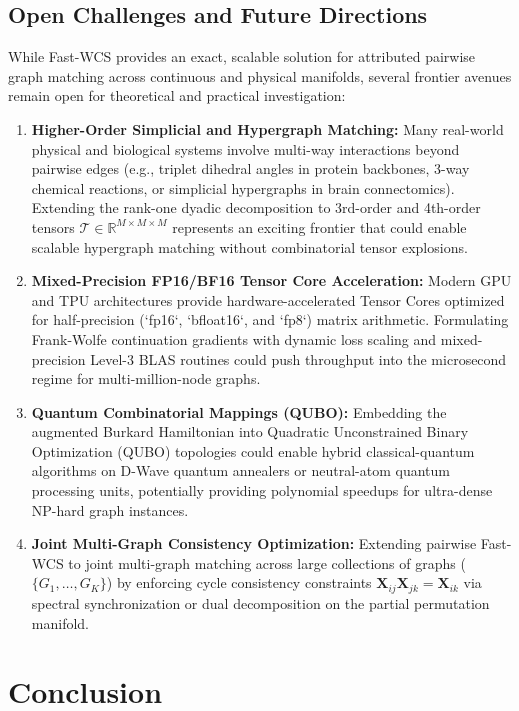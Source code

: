 \documentclass[a4paper,fleqn]{cas-dc}
\theoremstyle{thmstyleone}
\theoremstyle{thmstyletwo}
\theoremstyle{thmstylethree}
\begin{document}
\subsection{Open Challenges and Future Directions}
While Fast-WCS provides an exact, scalable solution for attributed pairwise graph matching across continuous and physical manifolds, several frontier avenues remain open for theoretical and practical investigation:
\begin{enumerate}
    \item \textbf{Higher-Order Simplicial and Hypergraph Matching:} Many real-world physical and biological systems involve multi-way interactions beyond pairwise edges (e.g., triplet dihedral angles in protein backbones, 3-way chemical reactions, or simplicial hypergraphs in brain connectomics). Extending the rank-one dyadic decomposition to 3rd-order and 4th-order tensors $\mathcal{T} \in \mathbb{R}^{M \times M \times M}$ represents an exciting frontier that could enable scalable hypergraph matching without combinatorial tensor explosions.
    \item \textbf{Mixed-Precision FP16/BF16 Tensor Core Acceleration:} Modern GPU and TPU architectures provide hardware-accelerated Tensor Cores optimized for half-precision (`fp16`, `bfloat16`, and `fp8`) matrix arithmetic. Formulating Frank-Wolfe continuation gradients with dynamic loss scaling and mixed-precision Level-3 BLAS routines could push throughput into the microsecond regime for multi-million-node graphs.
    \item \textbf{Quantum Combinatorial Mappings (QUBO):} Embedding the augmented Burkard Hamiltonian into Quadratic Unconstrained Binary Optimization (QUBO) topologies could enable hybrid classical-quantum algorithms on D-Wave quantum annealers or neutral-atom quantum processing units, potentially providing polynomial speedups for ultra-dense NP-hard graph instances.
    \item \textbf{Joint Multi-Graph Consistency Optimization:} Extending pairwise Fast-WCS to joint multi-graph matching across large collections of graphs ($\{G_1, \dots, G_K\}$) by enforcing cycle consistency constraints $\mathbf{X}_{ij} \mathbf{X}_{jk} = \mathbf{X}_{ik}$ via spectral synchronization or dual decomposition on the partial permutation manifold.
\end{enumerate}

\section{Conclusion}
\label{sec:conclusion}
\end{document}
